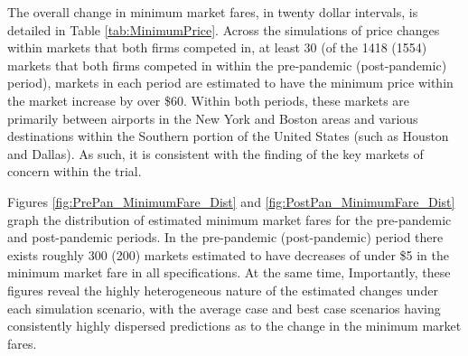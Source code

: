 \documentclass{article}
\begin{document}
     The overall change in minimum market fares, in twenty dollar intervals, is detailed in Table \ref{tab:MinimumPrice}. Across the simulations of price changes within markets that both firms competed in, at least 30 (of the 1418 (1554) markets that both firms competed in within the pre-pandemic (post-pandemic) period), markets in each period are estimated to have the minimum price within the market increase by over \$60. Within both periods, these markets are primarily between airports in the New York and Boston areas and various destinations within the Southern portion of the United States (such as Houston and Dallas). As such, it is consistent with the finding of the key markets of concern within the trial. 

    Figures \ref{fig:PrePan_MinimumFare_Dist} and \ref{fig:PostPan_MinimumFare_Dist} graph the distribution of estimated minimum market fares for the pre-pandemic and post-pandemic periods. In the pre-pandemic (post-pandemic) period there exists roughly 300 (200) markets estimated to have decreases of under \$5 in the minimum market fare in all specifications. At the same time,  Importantly, these figures reveal the highly heterogeneous nature of the estimated changes under each simulation scenario, with the average case and best case scenarios having consistently highly dispersed predictions as to the change in the minimum market fares.   

\end{document}
